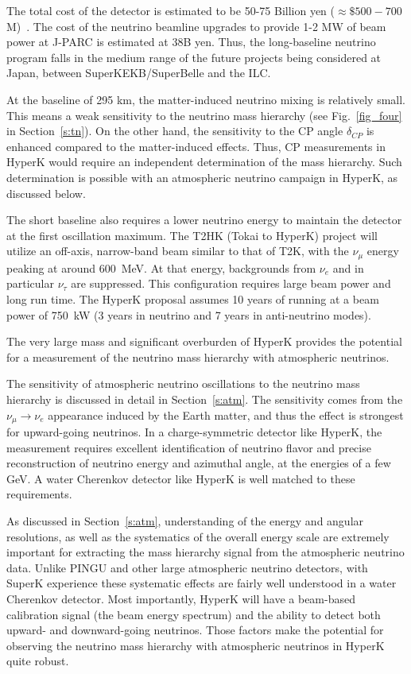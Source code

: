 The total cost of the detector is estimated to be 50-75 Billion yen
($\approx \$500-700$M)~\cite{nonus:JapanMasterPlan}. The cost of the
neutrino beamline upgrades to provide 1-2 MW of beam power at J-PARC
is estimated at 38B yen. Thus, the long-baseline neutrino program
falls in the medium range of the future projects being considered at
Japan, between SuperKEKB/SuperBelle and the ILC. 

At the baseline of 295 km, the matter-induced neutrino mixing is
relatively small. This means a weak sensitivity to the
neutrino mass hierarchy (see Fig.~\ref{fig_four} in
Section~\ref{s:tn}). On the other hand, the sensitivity to the CP
angle $\delta_{CP}$ is enhanced compared to the matter-induced
effects. Thus, CP measurements in HyperK would require an independent
determination of the mass hierarchy. Such determination is possible
with an atmospheric neutrino campaign in HyperK, as discussed below. 

The short baseline also requires a lower neutrino energy to maintain
the detector at the first oscillation maximum. The T2HK (Tokai to HyperK)
project will utilize an off-axis, narrow-band beam similar to that of
T2K, with the 
$\nu_\mu$ energy peaking at around 600~MeV. At that energy,
backgrounds from $\nu_e$ and in particular $\nu_\tau$ are
suppressed. This configuration requires large beam power and long run
time. The HyperK proposal assumes 10 years of running at a beam power of
750~kW (3 years in neutrino and 7 years in anti-neutrino modes). 


The very large mass and significant overburden of HyperK provides the
potential for  a measurement of the neutrino mass hierarchy
with atmospheric neutrinos. 

The sensitivity of atmospheric neutrino oscillations to the neutrino
mass hierarchy is discussed in detail in Section~\ref{s:atm}. 
The sensitivity comes from the $\nu_\mu\to \nu_e$
appearance induced by the Earth matter, and thus the effect is 
strongest for upward-going neutrinos. 
In a
charge-symmetric detector like HyperK, the measurement requires
excellent identification of neutrino flavor and
precise reconstruction of neutrino energy and azimuthal angle, at
the energies of a few GeV. A water Cherenkov detector like HyperK is
well matched to these requirements. 

As discussed in
Section~\ref{s:atm}, understanding of the energy and angular
resolutions, as well as the systematics of the overall energy scale
are extremely important for extracting the mass hierarchy signal from
the atmospheric neutrino data. Unlike PINGU and other large
atmospheric neutrino detectors, with SuperK experience these
systematic effects are fairly well understood in a water Cherenkov
detector. Most importantly, HyperK will have a beam-based calibration
signal (the beam energy spectrum) and the ability to detect both
upward- and downward-going neutrinos. Those factors make the potential
for observing the neutrino mass hierarchy with atmospheric neutrinos
in HyperK quite robust. 

